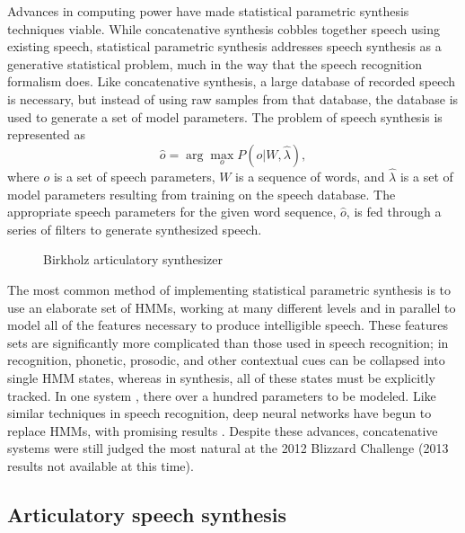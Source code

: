 \documentclass{article}
\begin{document}
Advances in computing power
have made statistical parametric synthesis
techniques viable.
While concatenative synthesis
cobbles together speech using existing speech,
statistical parametric synthesis
addresses speech synthesis
as a generative statistical problem,
much in the way that
the speech recognition formalism does.
Like concatenative synthesis,
a large database of recorded speech is necessary,
but instead of using
raw samples from that database,
the database is used to generate
a set of model parameters.
The problem of speech synthesis
is represented as
\begin{equation}
  \hat{o} = \arg \max_o P(o|W, \hat{\lambda}),
\end{equation}
where $o$ is a set of speech parameters,
$W$ is a sequence of words,
and $\hat{\lambda}$ is a set of model parameters
resulting from training on the speech database.
The appropriate speech parameters
for the given word sequence, $\hat{o}$,
is fed through a series of filters
to generate synthesized speech.

\begin{wrapfigure}{l}{0.421\textwidth}
  \vspace{-30pt}
  \begin{center}
  \end{center}
  \vspace{-12pt}
  \label{fig:birkholz}
  \caption{Birkholz articulatory synthesizer}
  \vspace{-20pt}
\end{wrapfigure}

The most common method of implementing
statistical parametric synthesis
is to use an elaborate set of HMMs,
working at many different levels
and in parallel to model
all of the features necessary to produce
intelligible speech.
These features sets are significantly
more complicated than those
used in speech recognition;
in recognition, phonetic, prosodic,
and other contextual cues
can be collapsed into single HMM states,
whereas in synthesis,
all of these states must be explicitly tracked.
In one system \citep{zen2007},
there over a hundred parameters to be modeled.
Like similar techniques in speech recognition,
deep neural networks have begun
to replace HMMs, with promising results
\citep{zen2013}.
Despite these advances, concatenative systems
were still judged the most natural
at the 2012 Blizzard Challenge
(2013 results not available at this time).

\subsection{Articulatory speech synthesis}
\end{document}
